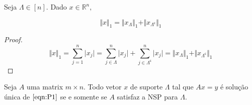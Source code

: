 \begin{lema}
Seja $\Lambda \in [n]$. Dado $x \in \mathbb{R}^n,$

$$ \Vert x \Vert_1 = \Vert x_{\Lambda} \Vert_1 + \Vert x_{\Lambda^{\mathsf{c}}} \Vert_1 $$
\end{lema}
\begin{proof} %
$$
\Vert x \Vert_1 = \sum_{j = 1}^n \vert x_j \vert
= \sum_{j \in \Lambda}^n \vert x_j \vert + \sum_{j \in \Lambda^{\mathsf{c}}}^n \vert x_j \vert
= \Vert x_{\Lambda} \Vert_1 + \Vert x_{\Lambda^{\mathsf{c}}} \Vert_1
$$
\end{proof}

\begin{teorema}
Seja $A$ uma matrix $m \times n$. Todo vetor $x$ de suporte $\Lambda$ tal que $Ax = y$ é solução única de $\eqref{eqn:P1}$ se e somente se $A$ satisfaz a NSP para $\Lambda$.
\end{teorema}
